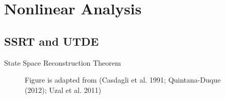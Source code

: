 \section{Nonlinear Analysis}

\subsection{SSRT and UTDE}
{

\begin{frame}{State Space Reconstruction Theorem}
    \begin{figure}
	{Figure is adapted from (Casdagli et al. 1991; Quintana-Duque (2012); Uzal et al. 2011)} 
   \end{figure}
	
\end{frame}
}


